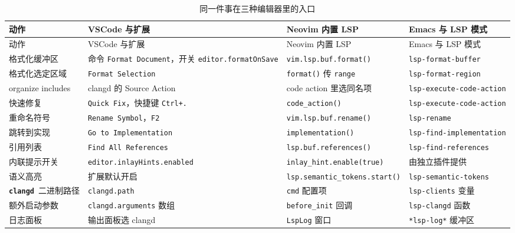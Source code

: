 \documentclass[12pt,a4paper,fontset=fandol]{ctexbook}
\newcommand{\Lib}[1]{\textbf{\texttt{#1}}}
\newcommand{\CD}{\Lib{clangd}}
\begin{document}
{\footnotesize
\begin{longtable}{@{}>{\raggedright\arraybackslash}p{}
                  >{\raggedright\arraybackslash}p{}
                  >{\raggedright\arraybackslash}p{}
                  >{\raggedright\arraybackslash}p{}@{}}
\caption{同一件事在三种编辑器里的入口}\label{tab:appB-editor}\\
\toprule
动作 & VSCode 与扩展 & Neovim 内置 LSP & Emacs 与 LSP 模式 \\
\midrule
\endfirsthead
\toprule
动作 & VSCode 与扩展 & Neovim 内置 LSP & Emacs 与 LSP 模式 \\
\midrule
\endhead
\bottomrule
\endlastfoot
格式化缓冲区 & 命令 \texttt{Format Document}，开关 \texttt{editor.\allowbreak formatOnSave} & \texttt{vim.lsp.buf.\allowbreak format()} & \texttt{lsp-format-\allowbreak buffer} \\
格式化选定区域 & \texttt{Format Selection} & \texttt{format()} 传 \texttt{range} & \texttt{lsp-format-\allowbreak region} \\
organize includes & clangd 的 Source Action & code action 里选同名项 & \texttt{lsp-execute-\allowbreak code-action} \\
快速修复 & \texttt{Quick Fix}，快捷键 \texttt{Ctrl+.} & \texttt{code\_\allowbreak action()} & \texttt{lsp-execute-\allowbreak code-action} \\
重命名符号 & \texttt{Rename Symbol}，\texttt{F2} & \texttt{vim.lsp.buf.\allowbreak rename()} & \texttt{lsp-rename} \\
跳转到实现 & \texttt{Go to Implementation} & \texttt{implementation()} & \texttt{lsp-find-\allowbreak implementation} \\
引用列表 & \texttt{Find All References} & \texttt{lsp.buf.\allowbreak references()} & \texttt{lsp-find-\allowbreak references} \\
内联提示开关 & \texttt{editor.inlay\-\allowbreak Hints.enabled} & \texttt{inlay\_hint.\allowbreak enable(true)} & 由独立插件提供 \\
语义高亮 & 扩展默认开启 & \texttt{lsp.semantic\_\allowbreak tokens.start()} & \texttt{lsp-semantic-\allowbreak tokens} \\
\CD\ 二进制路径 & \texttt{clangd.path} & \texttt{cmd} 配置项 & \texttt{lsp-clients} 变量 \\
额外启动参数 & \texttt{clangd.\allowbreak arguments} 数组 & \texttt{before\_init} 回调 & \texttt{lsp-clangd} 函数 \\
日志面板 & 输出面板选 clangd & \texttt{LspLog} 窗口 & \texttt{*lsp-log*} 缓冲区 \\
\end{longtable}
}
\end{document}
